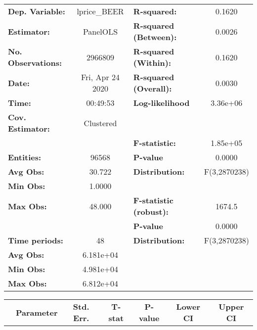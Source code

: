 \documentclass{report}
\begin{document}
\begin{center}
\begin{tabular}{lclc}
\toprule
\textbf{Dep. Variable:}    &    lprice\_BEER    & \textbf{  R-squared:         }   &      0.1620      \\
\textbf{Estimator:}        &      PanelOLS      & \textbf{  R-squared (Between):}  &      0.0026      \\
\textbf{No. Observations:} &      2966809       & \textbf{  R-squared (Within):}   &      0.1620      \\
\textbf{Date:}             &  Fri, Apr 24 2020  & \textbf{  R-squared (Overall):}  &      0.0030      \\
\textbf{Time:}             &      00:49:53      & \textbf{  Log-likelihood     }   &     3.36e+06     \\
\textbf{Cov. Estimator:}   &     Clustered      & \textbf{                     }   &                  \\
\textbf{}                  &                    & \textbf{  F-statistic:       }   &     1.85e+05     \\
\textbf{Entities:}         &       96568        & \textbf{  P-value            }   &      0.0000      \\
\textbf{Avg Obs:}          &       30.722       & \textbf{  Distribution:      }   &   F(3,2870238)   \\
\textbf{Min Obs:}          &       1.0000       & \textbf{                     }   &                  \\
\textbf{Max Obs:}          &       48.000       & \textbf{  F-statistic (robust):} &      1674.5      \\
\textbf{}                  &                    & \textbf{  P-value            }   &      0.0000      \\
\textbf{Time periods:}     &         48         & \textbf{  Distribution:      }   &   F(3,2870238)   \\
\textbf{Avg Obs:}          &     6.181e+04      & \textbf{                     }   &                  \\
\textbf{Min Obs:}          &     4.981e+04      & \textbf{                     }   &                  \\
\textbf{Max Obs:}          &     6.812e+04      & \textbf{                     }   &                  \\
\bottomrule
\end{tabular}
\begin{tabular}{lcccccc}
                           & \textbf{Parameter} & \textbf{Std. Err.} & \textbf{T-stat} & \textbf{P-value} & \textbf{Lower CI} & \textbf{Upper CI}  \\

\end{tabular}
\end{center}
\end{document}
